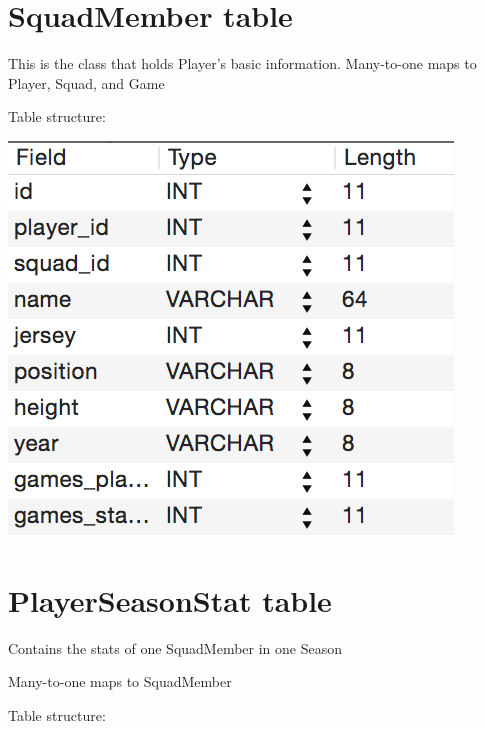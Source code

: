 \documentclass[letterpaper,10pt,english]{sphinxmanual}
\begin{document}
\section{SquadMember table}
\label{_static/database:squadmember-table}
This is the class that holds Player's basic information.
Many-to-one maps to Player, Squad, and Game

Table structure:

\includegraphics{squadmember_table.png}


\section{PlayerSeasonStat table}
\label{_static/database:playerseasonstat-table}
Contains the stats of one SquadMember in one Season

Many-to-one maps to SquadMember

Table structure:
\end{document}
